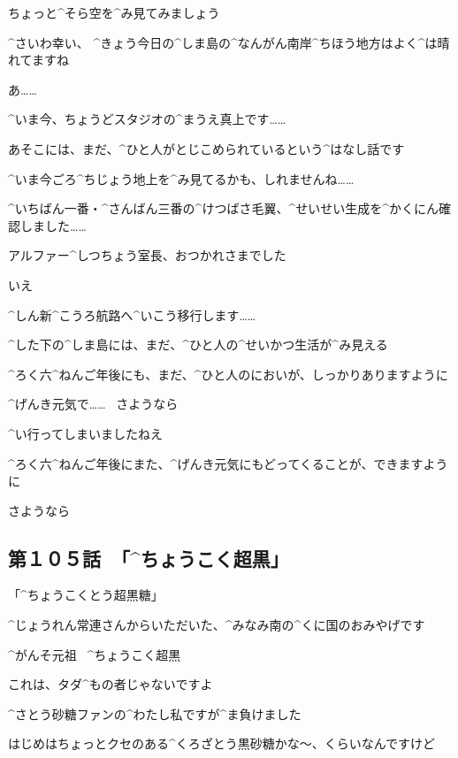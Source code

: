 \Person ちょっと^{そら}{空}を^{み}{見}てみましょう

\Person ^{さいわ}{幸}い、
^{きょう}{今日}の^{しま}{島}の^{なんがん}{南岸}^{ちほう}{地方}はよく^{は}{晴}れてますね

\page[63]
\Person あ……

\Person ^{いま}{今}、ちょうどスタジオの^{まうえ}{真上}です……

\page[65]
\Person あそこには、まだ、^{ひと}{人}がとじこめられているという^{はなし}{話}です

\Person ^{いま}{今}ごろ^{ちじょう}{地上}を^{み}{見}てるかも、しれませんね……

\page[69]
\Person ^{いちばん}{一番}・^{さんばん}{三番}の^{けつばさ}{毛翼}、^{せいせい}{生成}を^{かくにん}{確認}しました……

\Person アルファー^{しつちょう}{室長}、おつかれさまでした

\ASevenMOne いえ

\Person ^{しん}{新}^{こうろ}{航路}へ^{いこう}{移行}します……

\page
\ASevenMOne ^{した}{下}の^{しま}{島}には、まだ、^{ひと}{人}の^{せいかつ}{生活}が^{み}{見}える

\ASevenMOne ^{ろく}{六}^{ねんご}{年後}にも、まだ、^{ひと}{人}のにおいが、しっかりありますように

\ASevenMOne ^{げんき}{元気}で……
\ さようなら

\page
\Person ^{い}{行}ってしまいましたねえ

\page
\Person ^{ろく}{六}^{ねんご}{年後}にまた、^{げんき}{元気}にもどってくることが、できますように

\Person さようなら


\subsection{第１０５話\ 「^{ちょうこく}{超黒}」}

\page[74]
\Alpha 「^{ちょうこくとう}{超黒糖}」

\Alpha ^{じょうれん}{常連}さんからいただいた、^{みなみ}{南}の^{くに}{国}のおみやげです

\Sign ^{がんそ}{元祖}
\ ^{ちょうこく}{超黒}

\Alpha これは、タダ^{もの}{者}じゃないですよ

\Alpha ^{さとう}{砂糖}ファンの^{わたし}{私}ですが^{ま}{負}けました

\page
\Alpha はじめはちょっとクセのある^{くろざとう}{黒砂糖}かな〜、くらいなんですけど


